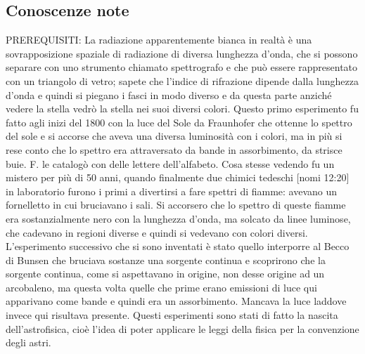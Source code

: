 \documentclass[a4paper,11pt]{article}
\begin{document}
\subsection{Conoscenze note}
PREREQUISITI: La radiazione apparentemente bianca in realtà è una sovrapposizione spaziale di radiazione di diversa lunghezza d’onda, che si possono separare con uno strumento chiamato spettrografo e che può essere rappresentato con un triangolo di vetro; sapete che l’indice di rifrazione dipende dalla lunghezza d’onda e quindi si piegano i fasci in modo diverso e da questa parte anziché vedere la stella vedrò la stella nei suoi diversi colori. Questo primo esperimento fu fatto agli inizi del 1800 con la luce del Sole da Fraunhofer che ottenne lo spettro del sole e si accorse che aveva una diversa luminosità con i colori, ma in più si rese conto che lo spettro era attraversato da bande in assorbimento, da strisce buie. F. le catalogò con delle lettere dell’alfabeto. Cosa stesse vedendo fu un mistero per più di 50 anni, quando finalmente due chimici tedeschi [nomi 12:20] in laboratorio furono i primi a divertirsi a fare spettri di fiamme: avevano un fornelletto in cui bruciavano i sali. Si accorsero che lo spettro di queste fiamme era sostanzialmente nero con la lunghezza d’onda, ma solcato da linee luminose, che cadevano in regioni diverse e quindi si vedevano con colori diversi. L’esperimento successivo che si sono inventati è stato quello interporre al Becco di Bunsen che bruciava sostanze una sorgente continua e scoprirono che la sorgente continua, come si aspettavano in origine, non desse origine ad un arcobaleno, ma questa volta quelle che prime erano emissioni di luce qui apparivano come bande e quindi era un assorbimento. Mancava la luce laddove invece qui risultava presente. Questi esperimenti sono stati di fatto la nascita dell’astrofisica, cioè l’idea di poter applicare le leggi della fisica per la convenzione degli astri. 
\newline
\end{document}
